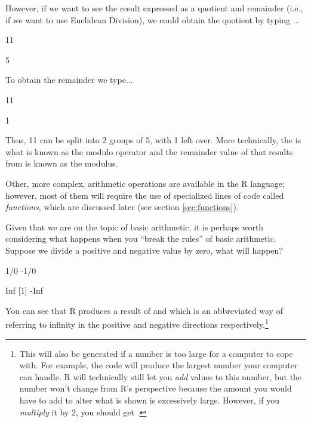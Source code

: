 \noindent However, if we want to see the result expressed as a quotient and remainder (i.e., if we want to use Euclidean Division), we could obtain the quotient by typing ...

\begin{inR}
11 %
\end{inR}

\begin{outR}
[1] 5
\end{outR}

To obtain the remainder we type...

\begin{inR}
11 %
\end{inR}

\begin{outR}
[1] 1
\end{outR}

Thus, 11 can be split into 2 groups of 5, with 1 left over.  More technically, the \R{\%\%} is what is known as the \gls{modulo operator} and the remainder value of  that results from  is known as the \gls{modulus}.

Other, more complex, arithmetic operations are available in the R language; however, most of them will require the use of specialized lines of code called \textit{functions}, which are discussed later (see section \ref{sec:functions}). 

Given that we are on the topic of basic arithmetic, it is perhaps worth considering what happens when you ``break the rules'' of basic arithmetic. Suppose we divide a positive and negative value by zero, what will happen?

\begin{inR}
1/0
-1/0
\end{inR}
\begin{outR}
[1] Inf
[1] -Inf
\end{outR}

\noindent
You can see that R produces a result of  and  which is an abbreviated way of referring to \gls{infinity} in the positive and negative directions respectively.\footnote{This will also be generated if a number is too large for a computer to cope with. For example, the code  will produce the largest number your computer can handle. R will technically still let you \textit{add} values to this number, but the number won't change from R's perspective because the amount you would have to add to alter what is shown is excessively large. However, if you \textit{multiply} it by 2, you should get .}

